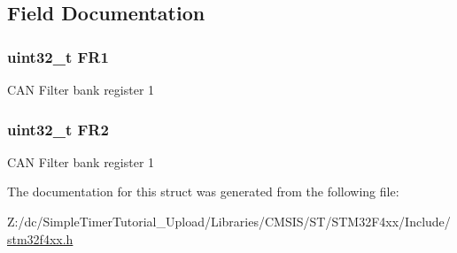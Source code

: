 \subsection{Field Documentation}
\hypertarget{struct_c_a_n___filter_register___type_def_a92036953ac673803fe001d843fea508b}{
\subsubsection[{F\-R1}]{ uint32\-\_\-t F\-R1}}\label{struct_c_a_n___filter_register___type_def_a92036953ac673803fe001d843fea508b}
C\-A\-N Filter bank register 1 \hypertarget{struct_c_a_n___filter_register___type_def_a7f7d80b45b7574463d7030fc8a464582}{
\subsubsection[{F\-R2}]{ uint32\-\_\-t F\-R2}}\label{struct_c_a_n___filter_register___type_def_a7f7d80b45b7574463d7030fc8a464582}
C\-A\-N Filter bank register 1 

The documentation for this struct was generated from the following file\-:\begin{DoxyCompactItemize}
\item 
Z\-:/dc/\-Simple\-Timer\-Tutorial\-\_\-\-Upload/\-Libraries/\-C\-M\-S\-I\-S/\-S\-T/\-S\-T\-M32\-F4xx/\-Include/\hyperlink{stm32f4xx_8h}{stm32f4xx.\-h}\end{DoxyCompactItemize}

